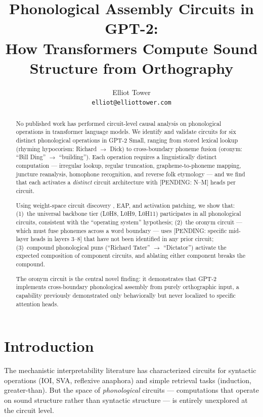 \documentclass{article}
\title{\textbf{Phonological Assembly Circuits in GPT-2:\\
How Transformers Compute Sound Structure from Orthography}}
\author{
  Elliot Tower \\
  \texttt{elliot@elliottower.com}
}
\newcommand{\PENDING}[1]{{\color{blue}[PENDING: #1]}}
\begin{document}
\maketitle

\begin{abstract}
No published work has performed circuit-level causal analysis on phonological
operations in transformer language models. We identify and validate circuits for
six distinct phonological operations in GPT-2 Small, ranging from stored lexical
lookup (rhyming hypocorism: Richard $\to$ Dick) to cross-boundary phoneme fusion
(oronym: ``Bill Ding'' $\to$ ``building''). Each operation requires a
linguistically distinct computation --- irregular lookup, regular truncation,
grapheme-to-phoneme mapping, juncture reanalysis, homophone recognition, and
reverse folk etymology --- and we find that each activates a \emph{distinct}
circuit architecture with \PENDING{N--M} heads per circuit.

Using weight-space circuit discovery \citep{tower2026weights}, EAP, and
activation patching, we show that: (1)~the universal backbone tier (L0H8, L0H9,
L0H11) participates in all phonological circuits, consistent with the
``operating system'' hypothesis; (2)~the oronym circuit --- which must fuse
phonemes across a word boundary --- uses \PENDING{specific mid-layer heads
in layers 3--8} that have not been identified in any prior circuit;
(3)~compound phonological puns (``Richard Tater'' $\to$ ``Dictator'') activate
the expected composition of component circuits, and ablating either component
breaks the compound.

The oronym circuit is the central novel finding: it demonstrates that GPT-2
implements cross-boundary phonological assembly from purely orthographic input,
a capability previously demonstrated only behaviorally
\citep{liao2026tokenization,suvarna2024phonologybench} but never localized to
specific attention heads.
\end{abstract}

\section{Introduction}

The mechanistic interpretability literature has characterized circuits for
syntactic operations (IOI, SVA, reflexive anaphora) and simple retrieval tasks
(induction, greater-than). But the space of \emph{phonological} circuits ---
computations that operate on sound structure rather than syntactic structure ---
is entirely unexplored at the circuit level.
\end{document}
